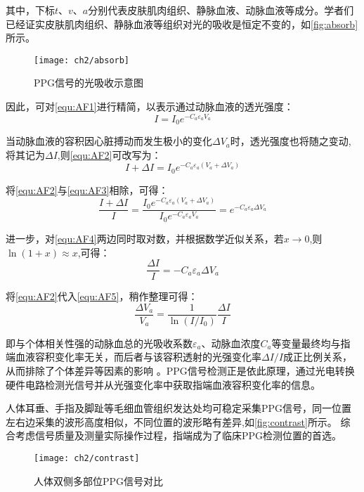其中，下标$t$、$v$、$a$分别代表皮肤肌肉组织、静脉血液、动脉血液等成分。学者们已经证实皮肤肌肉组织、静脉血液等组织对光的吸收是恒定不变的\cite{1980Spectrophotometric,4122392}，如\autoref{fig:absorb}所示。
\begin{figure}[htbp]
    \centering
    \texttt{[image: ch2/absorb]}
    \caption{\label{fig:absorb}PPG信号的光吸收示意图}
\end{figure}
因此，可对\autoref{equ:AF1}进行精简，以表示通过动脉血液的透光强度\cite{PPGYY}：
\begin{equation}
    \label{equ:AF2}
    I=I_{0}e^{-C_{a}\varepsilon _{a}V_{a}} 
\end{equation}

当动脉血液的容积因心脏搏动而发生极小的变化$\Delta V_{a}$时，透光强度也将随之变动,将其记为$\Delta I$,则\autoref{equ:AF2}可改写为：
\begin{equation}
    \label{equ:AF3}
    I+\Delta I=I_{0}e^{-C_{a}\varepsilon _{a}(V_{a}+\Delta V_{a})} 
\end{equation}

将\autoref{equ:AF2}与\autoref{equ:AF3}相除，可得：
\begin{equation}
    \label{equ:AF4}
    \frac{I+\Delta I}{I}=\frac{I_{0}e^{-C_{a}\varepsilon _{a}(V_{a}+\Delta V_{a})}}{I_{0}e^{-C_{a}\varepsilon _{a}V_{a}}}=e^{-C_{a}\varepsilon _{a}\Delta V_{a}} 
\end{equation}

进一步，对\autoref{equ:AF4}两边同时取对数，并根据数学近似关系，若$x\rightarrow 0$,则$\ln(1+x)\approx x$,可得：
\begin{equation}
    \label{equ:AF5}
    \frac{\Delta I}{I}=-C_{a}\varepsilon _{a}\Delta V_{a}
\end{equation}

将\autoref{equ:AF2}代入\autoref{equ:AF5}，稍作整理可得：
\begin{equation}
    \label{equ:AF6}
    \frac{\Delta V_{a}}{V_{a}}=\frac{1}{\ln(I/I_{0})}\frac{\Delta I}{I}
\end{equation}

即与个体相关性强的动脉血总的光吸收系数$\varepsilon _{a}$、动脉血浓度$C_{a}$等变量最终均与指端血液容积变化率无关，而后者与该容积透射的光强变化率$\Delta I/I$成正比例关系，从而排除了个体差异等因素的影响
\cite{1980Spectrophotometric,4122392,PPGYY}。PPG信号检测正是依此原理，通过光电转换硬件电路检测光信号并从光强变化率中获取指端血液容积变化率的信息。

人体耳垂、手指及脚趾等毛细血管组织发达处均可稳定采集PPG信号，同一位置左右边采集的波形高度相似，不同位置的波形略有差异\cite{Allen2000,Allen2007},如\autoref{fig:contrast}所示。
综合考虑信号质量及测量实际操作过程，指端成为了临床PPG检测位置的首选\cite{cwl}。
\begin{figure}[htbp]
    \centering
    \texttt{[image: ch2/contrast]}
    \caption{\label{fig:contrast}人体双侧多部位PPG信号对比}
\end{figure}


